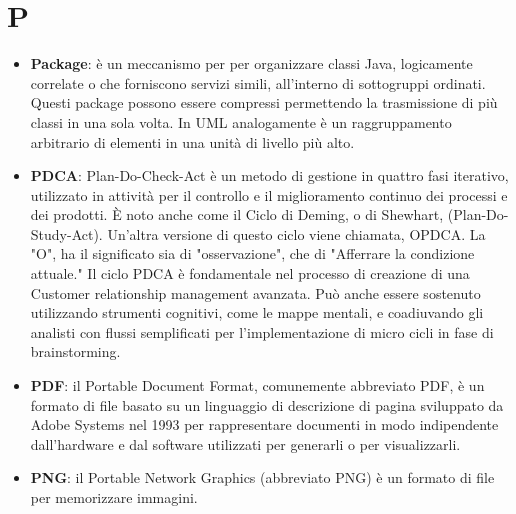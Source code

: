 \section{P}
\begin{itemize} 
	\item
	\textbf{Package}: è un meccanismo per per organizzare classi Java, logicamente correlate o che forniscono servizi simili, all’interno di sottogruppi ordinati. Questi package possono essere compressi permettendo la trasmissione di più classi in una sola volta.
	In UML analogamente è un raggruppamento arbitrario di elementi in una unità di livello più alto.
	\item
	\textbf{PDCA}: Plan-Do-Check-Act è un metodo di gestione in quattro fasi iterativo, utilizzato in attività per il controllo e il miglioramento continuo dei processi e dei prodotti. È noto anche come il Ciclo di Deming, o di Shewhart, (Plan-Do-Study-Act). Un'altra versione di questo ciclo viene chiamata, OPDCA. La "O", ha il significato sia di "osservazione", che di "Afferrare la condizione attuale." Il ciclo PDCA è fondamentale nel processo di creazione di una Customer relationship management avanzata. Può anche essere sostenuto utilizzando strumenti cognitivi, come le mappe mentali, e coadiuvando gli analisti con flussi semplificati per l'implementazione di micro cicli in fase di brainstorming.
	
	\item
	\textbf{PDF}: il Portable Document Format, comunemente abbreviato PDF, è un formato di file basato su un linguaggio di descrizione di pagina sviluppato da Adobe Systems nel 1993 per rappresentare documenti in modo indipendente dall’hardware e dal software utilizzati per generarli o per visualizzarli.
	\item
	\textbf{PNG}: il Portable Network Graphics (abbreviato PNG) è un formato di file per memorizzare immagini.
\end{itemize}

